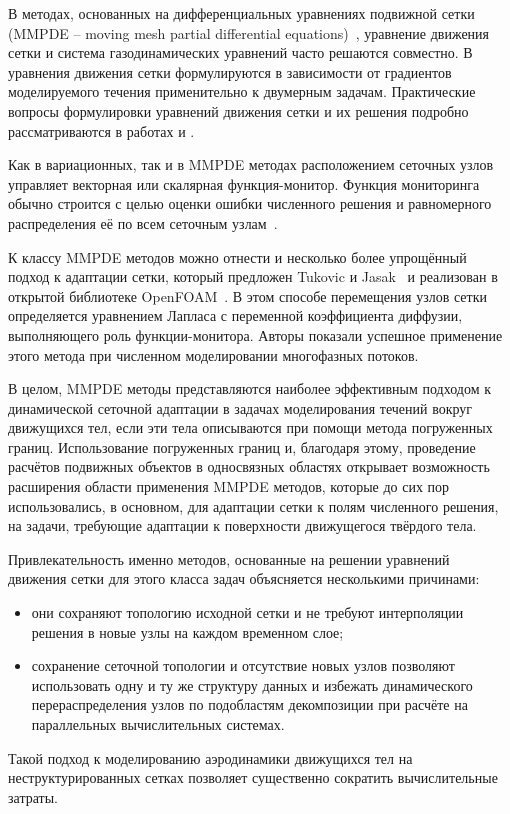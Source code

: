 	В методах, основанных на дифференциальных уравнениях подвижной сетки (MMPDE – moving mesh partial differential equations)~\cite{huang_moving_1994}, уравнение движения сетки и система газодинамических уравнений часто решаются совместно. В \cite{huang_moving_1998, huang_analysis_1997, huang_high_1998} уравнения движения сетки формулируются в зависимости от градиентов моделируемого течения применительно к двумерным задачам. Практические вопросы формулировки уравнений движения сетки и их решения подробно рассматриваются в работах \cite{huang_practical_2001} и \cite{budd_adaptivity_2009}.
	
	Как в вариационных, так и в MMPDE методах расположением сеточных узлов управляет векторная или скалярная функция-монитор. Функция мониторинга обычно строится с целью оценки ошибки численного решения и равномерного распределения её по всем сеточным узлам~\cite{cao_study_1999}.
	
	К классу MMPDE методов можно отнести и несколько более упрощённый подход к адаптации сетки, который предложен Tukovic и Jasak~\cite{jasak_automatic_2006, tukovic_moving_2012} и реализован в открытой библиотеке OpenFOAM~\cite{jasak_dynamic_2010}. В этом способе перемещения узлов сетки определяется уравнением Лапласа с переменной коэффициента диффузии, выполняющего роль функции-монитора. Авторы показали успешное применение этого метода при численном моделировании многофазных потоков.
	
	В целом, MMPDE методы представляются наиболее эффективным подходом к динамической сеточной адаптации в задачах моделирования течений вокруг движущихся тел, если эти тела описываются при помощи метода погруженных границ. Использование погруженных границ и, благодаря этому, проведение расчётов подвижных объектов в односвязных областях открывает возможность расширения области применения MMPDE методов, которые до сих пор использовались, в основном, для адаптации сетки к полям численного решения, на задачи, требующие адаптации к поверхности движущегося твёрдого тела. 
	
	Привлекательность именно методов, основанные на решении уравнений движения сетки для этого класса задач объясняется несколькими причинами:
	\begin{itemize}
		\item они сохраняют топологию исходной сетки и не требуют интерполяции решения в новые узлы на каждом временном слое;
		\item сохранение сеточной топологии и отсутствие новых узлов позволяют использовать одну и ту же структуру данных и избежать динамического перераспределения узлов по подобластям декомпозиции при расчёте на параллельных вычислительных системах.
	\end{itemize}
	Такой подход к моделированию аэродинамики движущихся тел на неструктурированных сетках позволяет существенно сократить вычислительные затраты.
	
	